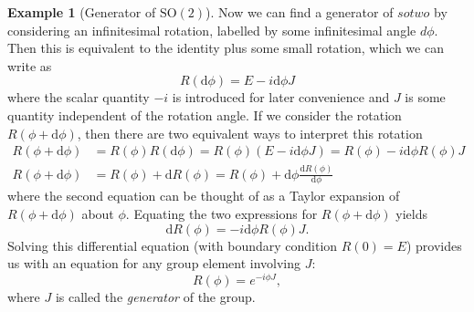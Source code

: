 \documentclass[12pt]{report}
\newcommand{\sotwo}{\textrm{SO}{(2)}}
\theoremstyle{definition}
\newtheorem{example}{Example}[chapter]
\begin{document}
\begin{example}[Generator of $\sotwo$]
    Now we can find a generator of $sotwo$ by considering an infinitesimal rotation, labelled by some infinitesimal angle $d\phi$. Then this is equivalent to the identity plus some small rotation, which we can write as
    \begin{equation}
        R(\textrm{d}\phi) = E - i \textrm{d}\phi J
    \end{equation}
    where the scalar quantity $-i$ is introduced for later convenience and $J$ is some quantity independent of the rotation angle. If we consider the rotation $R(\phi + \textrm{d}\phi)$, then there are two equivalent ways to interpret this rotation
    \begin{align}
        R(\phi + \textrm{d}\phi) &= R(\phi)R(\textrm{d}\phi) = R(\phi)(E - i \textrm{d}\phi J) = R(\phi) - i \textrm{d}\phi R(\phi)J \\
        R(\phi + \textrm{d}\phi) &= R(\phi) + \textrm{d}R(\phi) = R(\phi) + \textrm{d}\phi\frac{\textrm{d}R(\phi)}{\textrm{d}\phi}
    \end{align}
    where the second equation can be thought of as a Taylor expansion of $R(\phi + \textrm{d}\phi)$ about $\phi$. Equating the two expressions for $R(\phi + \textrm{d}\phi)$ yields
    \begin{equation}
        \textrm{d}R(\phi) = -i\textrm{d}\phi R(\phi)J.
    \end{equation}
    Solving this differential equation (with boundary condition $R(0)=E$) provides us with an equation for any group element involving $J$:
    \begin{equation}
        R(\phi) = e^{-i\phi J},
    \end{equation}
    where $J$ is called the \textit{generator} of the group.
\end{example}

% 
% 
\end{document}
